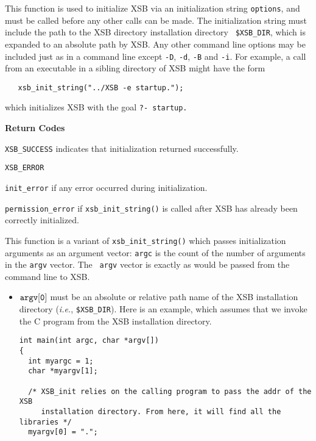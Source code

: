 \begin{description}

 This function is used to initialize
XSB via an initialization string {\tt *options}, and must be called
before any other calls can be made.  The initialization string must
include the path to the XSB directory installation directory {\tt
\$XSB\_DIR}, which is expanded to an absolute path by XSB.  Any other
  command line options may be included just as in a command line
  except {\tt -D}, {\tt -d}, {\tt -B} and {\tt -i}.  For example, a
  call from an executable in a sibling directory of XSB might have the
  form
\begin{verbatim}
   xsb_init_string("../XSB -e startup.");
\end{verbatim}
which initializes XSB with the goal {\tt ?- startup.}

{\bf Return Codes}  
\bi
\item {\tt XSB\_SUCCESS} indicates that initialization returned
  successfully.
%
\item {\tt XSB\_ERROR} 
\bi
\item {\tt init\_error} if any error occurred during initialization. 

\item {\tt permission\_error} if {\tt xsb\_init\_string()} is called
  after XSB has already been correctly initialized.  
\ei
%
\ei

 
%
This function is a variant of {\tt xsb\_init\_string()} which passes
initialization arguments as an argument vector: {\tt argc} is the
count of the number of arguments in the {\tt argv} vector.  The {\tt
  argv} vector is exactly as would be passed from the command line to
XSB.
\begin{itemize}
\item $\tt argv[0]$ must be an absolute or relative path name of the XSB
  installation directory ({\it i.e.}, {\tt \$XSB\_DIR}).  Here is an
  example, which assumes that we invoke the C program from the XSB
  installation directory.
    \begin{verbatim}
int main(int argc, char *argv[])
{ 
  int myargc = 1;
  char *myargv[1];

  /* XSB_init relies on the calling program to pass the addr of the XSB
     installation directory. From here, it will find all the libraries */
  myargv[0] = ".";


\end{verbatim}
\end{itemize}
\end{description}
